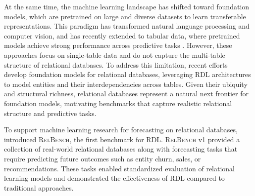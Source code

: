 \documentclass{article} %
\newcommand{\relbench}{\textsc{RelBench}\xspace}
\begin{document}


At the same time, the machine learning landscape has shifted toward foundation models, which are pretrained on large and diverse datasets to learn transferable representations. This paradigm has transformed natural language processing and computer vision, and has recently extended to tabular data, where pretrained models achieve strong performance across predictive tasks \citep{tabpfn,tabpfnv2,tabicl}. However, these approaches focus on single-table data and do not capture the multi-table structure of relational databases. To address this limitation, recent efforts~\citep{kumorfm, griffin, ranjan2025relational} develop foundation models for relational databases, leveraging RDL architectures to model entities and their interdependencies across tables. Given their ubiquity and structural richness, relational databases represent a natural next frontier for foundation models, motivating benchmarks that capture realistic relational structure and predictive tasks.

To support machine learning research for forecasting on relational databases, \cite{relbench} introduced  \relbench, the first benchmark for RDL. \relbench v1 provided a collection of real-world relational databases along with forecasting tasks that require predicting future outcomes such as entity churn, sales, or recommendations. These tasks enabled standardized evaluation of relational learning models and demonstrated the effectiveness of RDL compared to traditional approaches.
\end{document}
